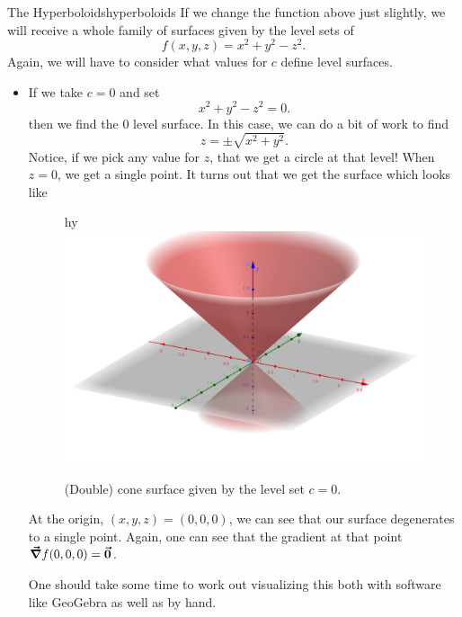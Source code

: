                 \begin{ex}{The Hyperboloids}{hyperboloids}
                If we change the function above just slightly, we will receive a whole family of surfaces given by the level sets of
                \[
                f(x,y,z)=x^2+y^2-z^2.
                \]
                Again, we will have to consider what values for $c$ define level surfaces.
                \begin{itemize}
                    \item If we take $c=0$ and set
                    \[
                    x^2+y^2-z^2=0.
                    \]
                    then we find the 0 level surface. In this case, we can do a bit of work to find
                    \[
                    z=\pm \sqrt{x^2+y^2}.
                    \]
                    Notice, if we pick any value for $z$, that we get a circle at that level!  When $z=0$, we get a single point.  It turns out that we get the  surface which looks like
                    \begin{figure}[H]hy
                        \centering
                     \includegraphics[width=.8\textwidth]{Figures_Part_6/cone_surface.png}
                     \caption{(Double) cone surface given by the level set $c=0$.}
                    \end{figure}
                    At the origin, $(x,y,z)=(0,0,0)$, we can see that our surface degenerates to a single point. Again, one can see that the gradient at that point $\boldsymbol{\vec{\nabla}} f(0,0,0) = \boldsymbol{\vec{0}}$.

                    One should take some time to work out visualizing this both with software like GeoGebra as well as by hand.


\end{itemize}
\end{ex}
